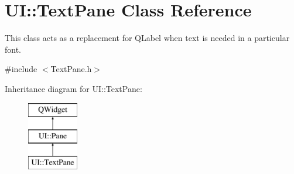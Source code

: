 \hypertarget{class_u_i_1_1_text_pane}{\section{U\-I\-:\-:Text\-Pane Class Reference}
\label{class_u_i_1_1_text_pane}
}


This class acts as a replacement for {\ttfamily Q\-Label} when text is needed in a particular font.  




{\ttfamily \#include $<$Text\-Pane.\-h$>$}

Inheritance diagram for U\-I\-:\-:Text\-Pane\-:\begin{figure}[H]
\begin{center}
\leavevmode
\includegraphics[height=3.000000cm]{class_u_i_1_1_text_pane}
\end{center}
\end{figure}

